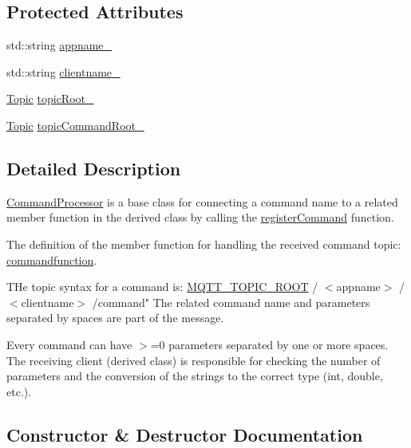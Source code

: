 \subsection*{Protected Attributes}
\begin{DoxyCompactItemize}
\item 
std\+::string \hyperlink{class_command_processor_aab13edb02dbcc123e831e1cce20695a0}{appname\+\_\+}
\item 
std\+::string \hyperlink{class_command_processor_a3922d658643297c47765181a251b10d3}{clientname\+\_\+}
\item 
\hyperlink{class_topic}{Topic} \hyperlink{class_command_processor_a97f0d615c62c8c7e1712522c4577ea53}{topic\+Root\+\_\+}
\item 
\hyperlink{class_topic}{Topic} \hyperlink{class_command_processor_ac695d4ff50c2dd91b25c8079b22170e4}{topic\+Command\+Root\+\_\+}
\end{DoxyCompactItemize}


\subsection{Detailed Description}
\hyperlink{class_command_processor}{Command\+Processor} is a base class for connecting a command name to a related member function in the derived class by calling the \hyperlink{class_command_processor_a72e15bc0082d628bd05aacedd5aa7ee0}{register\+Command} function.

The definition of the member function for handling the received command topic\+: \hyperlink{_command_processor_8h_a28db7178a71eff1027c055c9b19f6215}{commandfunction}.

T\+He topic syntax for a command is\+: \hyperlink{main__program_2fccf_m_q_t_t_8r383_2_m_q_t_tconfig_8h_a60fee359301005c276b7df20454f9a94}{M\+Q\+T\+T\+\_\+\+T\+O\+P\+I\+C\+\_\+\+R\+O\+OT} / $<$appname$>$ / $<$clientname$>$ /command" The related command name and parameters separated by spaces are part of the message.

Every command can have $>$=0 parameters separated by one or more spaces. The receiving client (derived class) is responsible for checking the number of parameters and the conversion of the strings to the correct type (int, double, etc.). 

\subsection{Constructor \& Destructor Documentation}
